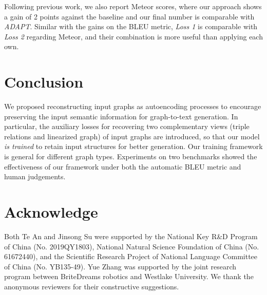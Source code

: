 \documentclass[11pt,a4paper]{article}
\begin{document}
Following previous work, we also report Meteor scores, where
our approach shows a gain of 2 points against the baseline and our final number is comparable with \emph{ADAPT}.
Similar with the gains on the BLEU metric, \emph{Loss 1} is comparable with \emph{Loss 2} regarding Meteor, and their combination is more useful than applying each own.


\section{Conclusion}


We proposed reconstructing input graphs as autoencoding processes to encourage preserving the input semantic information for graph-to-text generation.
In particular, the auxiliary losses for recovering two complementary views (triple relations and linearized graph) of input graphs are introduced, so that our model \emph{is trained} to retain input structures for better generation.
Our training framework is general for different graph types.
Experiments on two benchmarks showed the effectiveness of our framework under both the automatic BLEU metric and human judgements.


\section*{Acknowledge}


Both Te An and Jinsong Su were supported by the National Key R\&D Program of China (No. 2019QY1803), National Natural Science Foundation of China (No. 61672440), and the Scientific Research Project of National Language Committee of China (No. YB135-49).
Yue Zhang was supported by the joint research program between BriteDreams robotics and Westlake University.
We thank the anonymous reviewers for their constructive suggestions.




\end{document}
